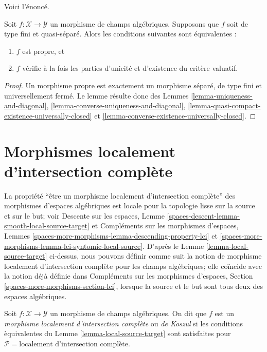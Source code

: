 \noindent
Voici l'énoncé.

\begin{lemma}
\label{lemma-criterion-proper}
Soit $f : \mathcal{X} \to \mathcal{Y}$ un morphisme de champs algébriques.
Supposons que $f$ soit de type fini et quasi-séparé.
Alors les conditions suivantes sont équivalentes :
\begin{enumerate}
\item $f$ est propre, et
\item $f$ vérifie à la fois les parties d'unicité et d'existence
du critère valuatif.
\end{enumerate}
\end{lemma}

\begin{proof}
Un morphisme propre est exactement un morphisme séparé, de type fini et
universellement fermé. Le lemme résulte donc des Lemmes
\ref{lemma-uniqueness-and-diagonal},
\ref{lemma-converse-uniqueness-and-diagonal},
\ref{lemma-quasi-compact-existence-universally-closed} et
\ref{lemma-converse-existence-universally-closed}.
\end{proof}





 
 
\section{Morphismes localement d'intersection compl\`ete}
\label{section-lci}

\noindent
La propri\'et\'e ``\^etre un morphisme localement d'intersection compl\`ete''
des morphismes d'espaces alg\'ebriques est
locale pour la topologie lisse sur la source et sur le but; voir
Descente sur les espaces, Lemme \ref{spaces-descent-lemma-smooth-local-source-target}
et
Compl\'ements sur les morphismes d'espaces, Lemmes
\ref{spaces-more-morphisms-lemma-descending-property-lci} et
\ref{spaces-more-morphisms-lemma-lci-syntomic-local-source}.
D'apr\`es le Lemme \ref{lemma-local-source-target} ci-dessus, nous pouvons d\'efinir
comme suit la notion de morphisme localement d'intersection compl\`ete
pour les champs alg\'ebriques; elle co\"incide avec la
notion d\'ej\`a d\'efinie dans
Compl\'ements sur les morphismes d'espaces,
Section \ref{spaces-more-morphisms-section-lci},
lorsque la source et le but sont tous deux des espaces alg\'ebriques.

\begin{definition}
\label{definition-lci}
Soit $f : \mathcal{X} \to \mathcal{Y}$ un morphisme de champs alg\'ebriques.
On dit que $f$ est un {\it morphisme localement d'intersection compl\`ete} ou
{\it de Koszul} si les conditions \`equivalentes du
Lemme \ref{lemma-local-source-target}
sont satisfaites pour $\mathcal{P} = \text{localement d'intersection compl\`ete}$.
\end{definition}

